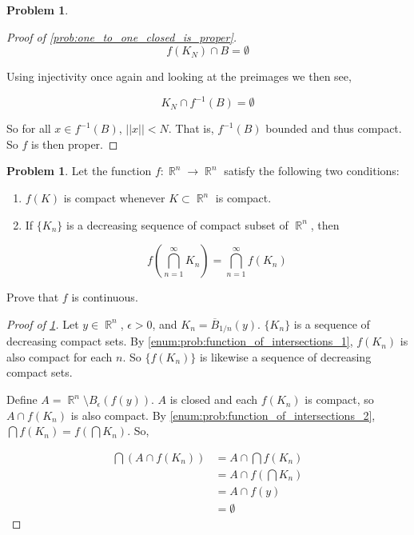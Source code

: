 \documentclass[english]{article}
\DeclareMathOperator{\R}{\mathbb{R}}
\DeclareMathOperator{\<}{\langle}
\renewcommand{\>}{\rangle}
\newcommand{\inv}[1]{#1^{-1}}
\theoremstyle{definition}
\newtheorem{problem}[theorem]{Problem}
\begin{document}
\begin{problem}
\begin{proof}[Proof of \cref{prob:one_to_one_closed_is_proper}]
        \[
          f(K_N) \cap B = \emptyset  
        \]

        Using injectivity once again and looking at the preimages we then see,

        \[
          K_N \cap \inv{f}(B) = \emptyset  
        \]

        So for all $x \in \inv{f}(B)$, $||x|| < N$. That is, $\inv{f}(B)$ bounded and thus compact. So $f$ is then proper.
    \end{proof}
\end{problem}

\begin{problem}
    \label{prob:function_of_intersections}
    Let the function $f: \R^n \to \R^n$ satisfy the following two conditions:
    
    \begin{enumerate}
        \item \label{enum:prob:function_of_intersections_1} $f(K)$ is compact whenever $K \subset \R^n$ is compact.
        \item \label{enum:prob:function_of_intersections_2} If $\{K_n\}$ is a decreasing sequence of compact subset of $\R^n$, then 
        
        \[
            f\left(\bigcap_{n = 1}^{\infty} K_n \right) = \bigcap_{n = 1}^{\infty} f(K_n)
        \]
    \end{enumerate}

    Prove that $f$ is continuous.

    \begin{proof}[Proof of \cref{prob:function_of_intersections}]
        Let $y \in \R^n$, $\epsilon > 0$, and $K_n = \overline{B}_{1/n}(y)$. $\{K_n\}$ is a sequence of decreasing compact sets. By \cref{enum:prob:function_of_intersections_1}, $f(K_n)$ is also compact for each $n$. So $\{f(K_n)\}$ is likewise a sequence of decreasing compact sets. 

        Define $A = \R^n \setminus B_{\epsilon}(f(y))$. $A$ is closed and each $f(K_n)$ is compact, so $A \cap f(K_n)$ is also compact. By \cref{enum:prob:function_of_intersections_2}, $\bigcap f(K_n) = f\left(\bigcap K_n \right)$. So,

        \begin{align*}
            \bigcap \left(A \cap f(K_n)\right)
            & = A \cap \bigcap f(K_n) \\
            & = A \cap f\left(\bigcap K_n \right) \\
            & = A \cap f(y) \\
            & = \emptyset
        \end{align*}


\end{proof}
\end{problem}
\end{document}
